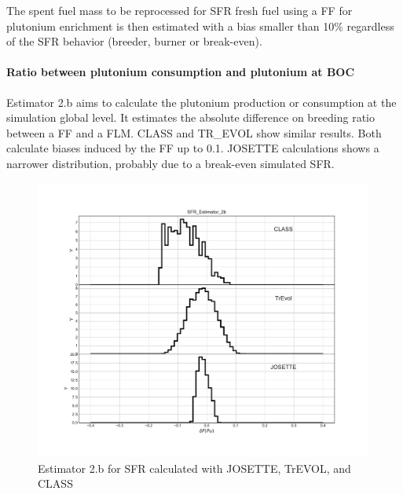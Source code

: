 The spent fuel mass to be reprocessed for \gls{SFR} fresh fuel using a \gls{FF}
for plutonium enrichment is then estimated with a bias smaller than 10\%
regardless of the \gls{SFR} behavior (breeder, burner or break-even).  

\paragraph{Ratio between plutonium consumption and plutonium at \gls{BOC}}

Estimator 2.b aims to calculate the plutonium production or consumption at the
simulation global level. It estimates the absolute difference on breeding
ratio between a \gls{FF} and a \gls{FLM}. CLASS and TR\_EVOL show similar
results. Both calculate biases induced by the \gls{FF} up to 0.1. JOSETTE
calculations shows a narrower distribution, probably due to a
break-even simulated \gls{SFR}.   

\begin{figure}[h]
	\begin{center}
		\includegraphics[width = 0.99\textwidth]{../../Feature_1/RAW_DATA/FIG/SFR_Estimator_2b.pdf}
		\caption{Estimator 2.b for \gls{SFR} calculated with JOSETTE, TrEVOL, and CLASS}
		\label{fig:Est2_SFR}
	\end{center}
\end{figure}

